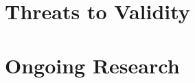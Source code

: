 \documentclass{llncs}
\begin{document}


\section{Threats to Validity}
\label{sec:threats}



\section{Ongoing Research}
\label{sec:ongoing}
\end{document}
